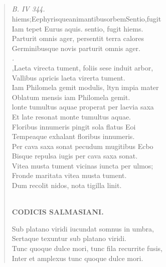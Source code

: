 \documentclass[11pt, a4paper]{report}
\begin{document}
            \subsection*{}
      \begin{verse}
      \textit{B. IV 344.} \\ hiems;EephyrisqueanimantibusorbemSentio,fugit \\ Iam tepet Eurus aquis. sentio, fugit hiems. \\ Parturit omnis ager, persentit terra calores \\ Germinibusque novis parturit omnis ager. \\ \textit{.} \\ ,Laeta virecta tument, foliis sese induit arbor, \\ Vallibus apricis laeta virerta tument. \\ Iam Philomela gemit modulis, ltyn impia mater \\ Oblatum mensis iam Philomela gemit. \\ lonte tumultus aquae properat per laevia saxa \\ Et late resonat monte tumultus aquae. \\ Floribus innumeris pingit sola flatus Eoi \\ Tempeaque exhalant floribus innumeris. \\ Per cava saxa sonat pecudum mugitibus Ecbo \\ Bisque repulsa iugis per cava saxa sonat. \\ Vitea musta tument vicinas iuncta per ulmos; \\ Fronde maritata vitea musta tument. \\ Dum recolit nidos, nota tigilla linit. \\ 
        ﻿\pagebreak 
    \begin{center} \textbf{CODICIS SALMASIANI.} \end{center} \marginpar{[195]} Sub platano viridi iucundat somnus in umbra, \\ Sertaque texuntur sub platano viridi. \\ Tunc quoque dulce mori, tunc fila recurrite fusis, \\ Inter et amplexus tunc quoque dulce mori. \\ 
      \end{verse}
  
\end{document}
